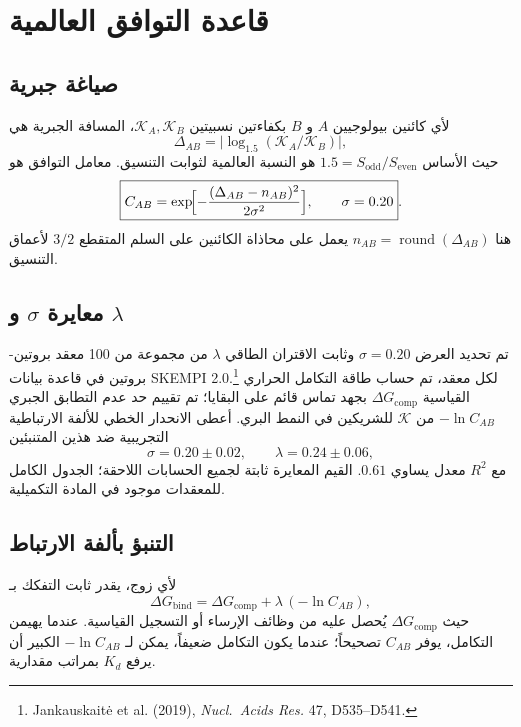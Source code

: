 \documentclass[11pt,a4paper]{article}
\newcommand{\REL}{\mathcal{K}}
\begin{document}
	\section{قاعدة التوافق العالمية}
	\label{sec:compatibility}
	
	\subsection{صياغة جبرية}
	لأي كائنين بيولوجيين \(A\) و \(B\) بكفاءتين نسبيتين \(\REL_A,\REL_B\)، المسافة الجبرية هي
	\[
	\Delta_{AB} = \bigl|\log_{1.5}(\REL_A/\REL_B)\bigr|,
	\]
	حيث الأساس \(1.5 = S_{\mathrm{odd}}/S_{\mathrm{even}}\) هو النسبة العالمية لثوابت التنسيق. معامل التوافق هو
	\begin{equation}
		\boxed{C_{AB} = \exp\!\Bigl[-\frac{(\Delta_{AB}-n_{AB})^2}{2\sigma^2}\Bigr],\qquad \sigma = 0.20}.
		\label{eq:Cab}
	\end{equation}
	هنا \(n_{AB} = \operatorname{round}(\Delta_{AB})\) يعمل على محاذاة الكائنين على السلم المتقطع \(3/2\) لأعماق التنسيق.
	
	\subsection{معايرة \(\sigma\) و \(\lambda\)}
	تم تحديد العرض \(\sigma = 0.20\) وثابت الاقتران الطاقي \(\lambda\) من مجموعة من 100 معقد بروتين-بروتين في قاعدة بيانات SKEMPI 2.0.\footnote{Jankauskaitė et al. (2019), \emph{Nucl.\ Acids Res.} 47, D535–D541.} لكل معقد، تم حساب طاقة التكامل الحراري القياسية \(\Delta G_{\mathrm{comp}}\) بجهد تماس قائم على البقايا؛ تم تقييم حد عدم التطابق الجبري \(-\ln C_{AB}\) من \(\REL\) للشريكين في النمط البري. أعطى الانحدار الخطي للألفة الارتباطية التجريبية ضد هذين المتنبئين
	\[
	\sigma = 0.20 \pm 0.02,\qquad \lambda = 0.24 \pm 0.06,
	\]
	مع \(R^2\) معدل يساوي \(0.61\).
	القيم المعايرة ثابتة لجميع الحسابات اللاحقة؛ الجدول الكامل للمعقدات موجود في المادة التكميلية.
	
	\subsection{التنبؤ بألفة الارتباط}
	لأي زوج، يقدر ثابت التفكك بـ
	\[
	\Delta G_{\mathrm{bind}} = \Delta G_{\mathrm{comp}} + \lambda\,(-\ln C_{AB}),
	\label{eq:Kd}
	\]
	حيث \(\Delta G_{\mathrm{comp}}\) يُحصل عليه من وظائف الإرساء أو التسجيل القياسية. عندما يهيمن التكامل، يوفر \(C_{AB}\) تصحيحاً؛ عندما يكون التكامل ضعيفاً، يمكن لـ \(-\ln C_{AB}\) الكبير أن يرفع \(K_d\) بمراتب مقدارية.
	
\end{document}
